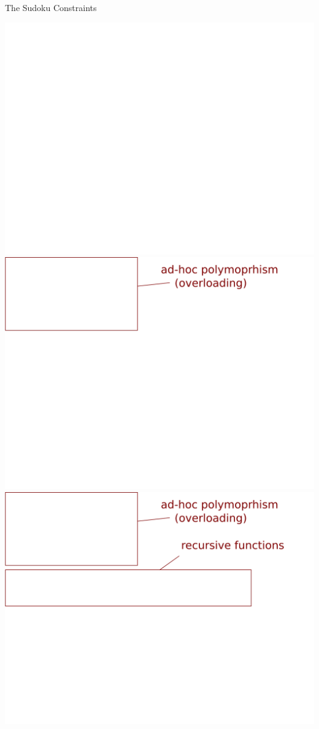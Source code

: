 \documentclass{beamer}
\begin{document}
\begin{frame}{The Sudoku Constraints}
\begin{overprint}
 \includegraphics[width=\textwidth]{isvalid7}
 \includegraphics[width=\textwidth]{isvalid8}
 \includegraphics[width=\textwidth]{isvalid9}

\end{overprint}
\end{frame}
\end{document}
